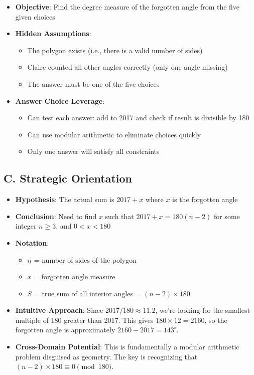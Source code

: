 \documentclass[]{article}
\begin{document}
\begin{problemconfigbox}
\begin{itemize}[leftmargin=*]
    \item \textbf{Objective}: Find the degree measure of the forgotten angle from the five given choices
    
    \item \textbf{Hidden Assumptions}: 
    \begin{itemize}
        \item The polygon exists (i.e., there is a valid number of sides)
        \item Claire counted all other angles correctly (only one angle missing)
        \item The answer must be one of the five choices
    \end{itemize}
    
    \item \textbf{Answer Choice Leverage}: 
    \begin{itemize}
        \item Can test each answer: add to 2017 and check if result is divisible by 180
        \item Can use modular arithmetic to eliminate choices quickly
        \item Only one answer will satisfy all constraints
    \end{itemize}
\end{itemize}

\subsection*{C. Strategic Orientation}
\begin{itemize}[leftmargin=*]
    \item \textbf{Hypothesis}: The actual sum is $2017 + x$ where $x$ is the forgotten angle
    
    \item \textbf{Conclusion}: Need to find $x$ such that $2017 + x = 180(n-2)$ for some integer $n \geq 3$, and $0 < x < 180$
    
    \item \textbf{Notation}: 
    \begin{itemize}
        \item $n$ = number of sides of the polygon
        \item $x$ = forgotten angle measure
        \item $S$ = true sum of all interior angles = $(n-2) \times 180$
    \end{itemize}
    
    \item \textbf{Intuitive Approach}: Since $2017/180 \approx 11.2$, we're looking for the smallest multiple of 180 greater than 2017. This gives $180 \times 12 = 2160$, so the forgotten angle is approximately $2160 - 2017 = 143^\circ$.
    
    \item \textbf{Cross-Domain Potential}: This is fundamentally a modular arithmetic problem disguised as geometry. The key is recognizing that $(n-2) \times 180 \equiv 0 \pmod{180}$.
\end{itemize}
\end{problemconfigbox}
\end{document}
